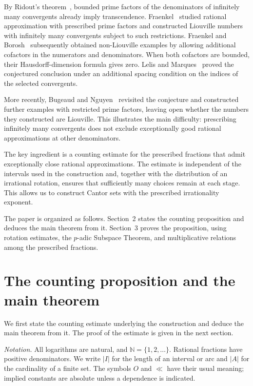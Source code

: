 \documentclass[11pt,reqno]{amsart}
\theoremstyle{definition}
\newcommand{\N}{\mathbb N}
\begin{document}
By Ridout's theorem~\cite{Ridout}, bounded prime factors of the
denominators of infinitely many convergents already imply
transcendence. Fraenkel~\cite{Fraenkel62,Fraenkel} studied rational
approximation with prescribed prime factors and constructed Liouville
numbers with infinitely many convergents subject to such restrictions.
Fraenkel and Borosh~\cite{FraenkelBorosh} subsequently obtained
non-Liouville examples by allowing additional cofactors in the
numerators and denominators. When both cofactors are bounded, their
Hausdorff-dimension formula gives zero. Lelis and Marques~\cite[Theorem~1.1]{LelisMarques}
proved the conjectured conclusion under an additional
spacing condition on the indices of the selected convergents.

More recently, Bugeaud and Nguyen~\cite[Question~4.1, p.~32]{BN}
revisited the conjecture and constructed further examples with
restricted prime factors, leaving open whether the numbers they
constructed are Liouville. This illustrates the main difficulty:
prescribing infinitely many convergents does not exclude
exceptionally good rational approximations at other denominators.


The key ingredient is a counting estimate for the
prescribed fractions that admit exceptionally close
rational approximations. The estimate is independent
of the intervals used in the construction and, together
with the distribution of an irrational rotation, ensures
that sufficiently many choices remain at each stage.
This allows us to construct Cantor sets with the
prescribed irrationality exponent.

The paper is organized as follows. Section~2 states the
counting proposition and deduces the main theorem from it.
Section~3 proves the proposition, using rotation estimates,
the $p$-adic Subspace Theorem, and multiplicative relations
among the prescribed fractions.


\section{The counting proposition and the main theorem}
\label{sec:main}

We first state the counting estimate underlying the
construction and deduce the main theorem from it.
The proof of the estimate is given in the next section.

\smallskip
\noindent\emph{Notation.}
All logarithms are natural, and $\N=\{1,2,\ldots\}$. Rational
fractions have positive denominators. We write $|I|$ for the
length of an interval or arc and $|A|$ for the cardinality of a
finite set. The symbols $O$ and $\ll$ have their usual meaning;
implied constants are absolute unless a dependence is indicated.
\end{document}
